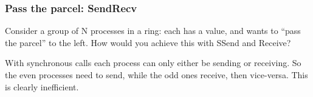 \begin{Shaded}
\begin{Highlighting}[]
      
\end{Highlighting}
\end{Shaded}

\subsubsection{Pass the parcel:
SendRecv}\label{pass-the-parcel-sendrecv}

Consider a group of N processes in a ring: each has a value, and wants
to ``pass the parcel'' to the left. How would you achieve this with
SSend and Receive?

\begin{Shaded}
\begin{Highlighting}[]

     
     \NormalTok{;}

     \NormalTok{;}
     \NormalTok{;}
     \NormalTok{) \{}
      \NormalTok{;}
    \NormalTok{\}}
     \NormalTok{)\{}
      \NormalTok{;}
    \NormalTok{\}}
\end{Highlighting}
\end{Shaded}

With synchronous calls each process can only either be sending or
receiving. So the even processes need to send, while the odd ones
receive, then vice-versa. This is clearly inefficient.

